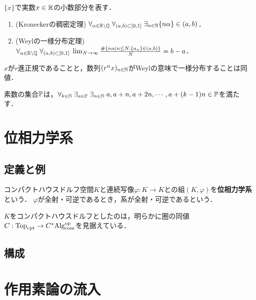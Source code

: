 \documentclass[uplatex,dvipdfmx]{jsreport}
\begin{document}
\begin{theorem}
    $\{x\}$で実数$x\in\mathbb{R}$の小数部分を表す．
    \begin{enumerate}
        \item (Kroneckerの稠密定理) $\forall_{\alpha\in\mathbb{R}\setminus\mathbb{Q}}\;\forall_{(a,b)\subset[0,1]}\;\exists_{n\in\mathbb{N}}\{n\alpha\}\in(a,b)$．
        \item (Weylの一様分布定理) $\forall_{\alpha\in\mathbb{R}\setminus\mathbb{Q}}\;\forall_{(a,b)\subset[0,1]}\;\lim_{N\to\infty}\frac{\#\left\{n\alpha\mid n\le N,\{a_n\}\in(a,b)\right\}}{N}=b-a$．
    \end{enumerate}
\end{theorem}
\begin{remark}
    $x$が$r$進正規であることと，数列$(r^nx)_{n\in\mathbb{N}}$がWeylの意味で一様分布することは同値．
\end{remark}

\begin{theorem}
    素数の集合$\mathbb{P}$は，$\forall_{k\in\mathbb{N}}\;\exists_{a\in\mathbb{P}}\;\exists_{n\in\mathbb{N}}\;a,a+n,a+2n,\cdots,a+(k-1)n\in\mathbb{P}$を満たす．
\end{theorem}

\chapter{位相力学系}

\section{定義と例}

\begin{definition}
    コンパクトハウスドルフ空間$K$と連続写像$\varphi:K\to K$との組$(K,\varphi)$を\textbf{位相力学系}という．
    $\varphi$が全射・可逆であるとき，系が全射・可逆であるという．
\end{definition}
\begin{remark}
    $K$をコンパクトハウスドルフとしたのは，明らかに圏の同値$C:\mathrm{Top}_{\mathrm{cpt}}\to C^*\mathrm{Alg}^{\mathrm{op}}_{\mathrm{com}}$を見据えている．
\end{remark}

\section{構成}

\chapter{作用素論の流入}
\end{document}
